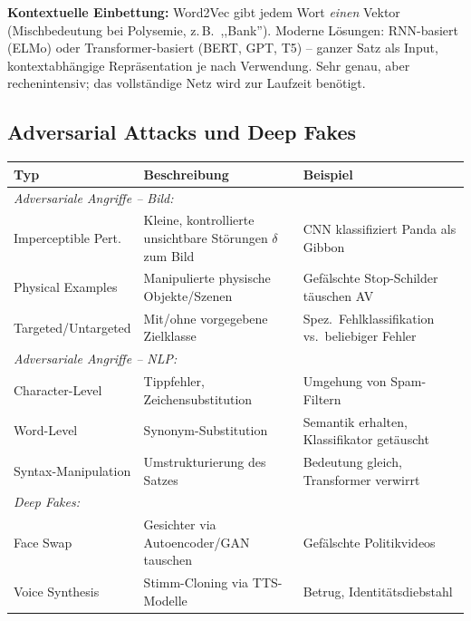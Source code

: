 \textbf{Kontextuelle Einbettung:} Word2Vec gibt jedem Wort \emph{einen} Vektor (Mischbedeutung bei Polysemie, z.\,B.\ ,,Bank''). Moderne Lösungen: RNN-basiert (ELMo) oder Transformer-basiert (BERT, GPT, T5) -- ganzer Satz als Input, kontextabhängige Repräsentation je nach Verwendung. Sehr genau, aber rechenintensiv; das vollständige Netz wird zur Laufzeit benötigt.

\newpage

\subsection{Adversarial Attacks und Deep Fakes}


\begin{table}[H]
\centering
\begin{tabular}{p{3.5cm} p{5.5cm} p{5.5cm}}
\hline
\textbf{Typ} & \textbf{Beschreibung} & \textbf{Beispiel} \\
\hline
\multicolumn{3}{l}{\textit{Adversariale Angriffe -- Bild:}} \\
Imperceptible Pert. & Kleine, kontrollierte unsichtbare Störungen $\delta$ zum Bild & CNN klassifiziert Panda als Gibbon \\
Physical Examples & Manipulierte physische Objekte/Szenen & Gefälschte Stop-Schilder täuschen AV \\
Targeted/Untargeted & Mit/ohne vorgegebene Zielklasse & Spez.\ Fehlklassifikation vs.\ beliebiger Fehler \\
\hline
\multicolumn{3}{l}{\textit{Adversariale Angriffe -- NLP:}} \\
Character-Level & Tippfehler, Zeichensubstitution & Umgehung von Spam-Filtern \\
Word-Level & Synonym-Substitution & Semantik erhalten, Klassifikator getäuscht \\
Syntax-Manipulation & Umstrukturierung des Satzes & Bedeutung gleich, Transformer verwirrt \\
\hline
\multicolumn{3}{l}{\textit{Deep Fakes:}} \\
Face Swap & Gesichter via Autoencoder/GAN tauschen & Gefälschte Politikvideos \\
Voice Synthesis & Stimm-Cloning via TTS-Modelle & Betrug, Identitätsdiebstahl \\
\hline
\end{tabular}
\end{table}


